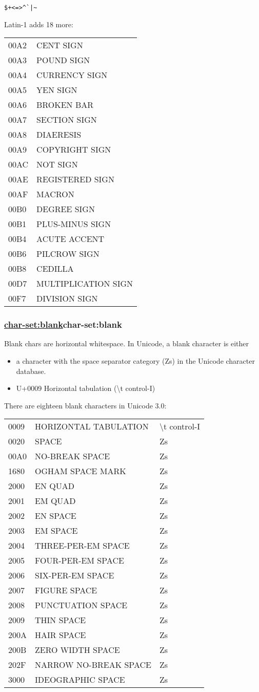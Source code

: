 \begin{verbatim}
$+<=>^`|~
\end{verbatim}

Latin-1 adds 18 more:

\begin{tabular}{ll}
00A2 & CENT SIGN\tabularnewline
00A3 & POUND SIGN\tabularnewline
00A4 & CURRENCY SIGN\tabularnewline
00A5 & YEN SIGN\tabularnewline
00A6 & BROKEN BAR\tabularnewline
00A7 & SECTION SIGN\tabularnewline
00A8 & DIAERESIS\tabularnewline
00A9 & COPYRIGHT SIGN\tabularnewline
00AC & NOT SIGN\tabularnewline
00AE & REGISTERED SIGN\tabularnewline
00AF & MACRON\tabularnewline
00B0 & DEGREE SIGN\tabularnewline
00B1 & PLUS-MINUS SIGN\tabularnewline
00B4 & ACUTE ACCENT\tabularnewline
00B6 & PILCROW SIGN\tabularnewline
00B8 & CEDILLA\tabularnewline
00D7 & MULTIPLICATION SIGN\tabularnewline
00F7 & DIVISION SIGN\tabularnewline
\end{tabular}

\subsubsection{{\href{}{char-set:blank}}{char-set:blank}}\label{char-setblank}

Blank chars are horizontal whitespace. In Unicode, a blank character is
either

\begin{itemize}
\tightlist
\item
  a character with the space separator category (Zs) in the Unicode
  character database.
\item
  U+0009 Horizontal tabulation (\textbackslash{}t control-I)
\end{itemize}

There are eighteen blank characters in Unicode 3.0:

\begin{tabular}{lll}
0009 & HORIZONTAL TABULATION & \textbackslash{}t
control-I\tabularnewline
0020 & SPACE & Zs\tabularnewline
00A0 & NO-BREAK SPACE & Zs\tabularnewline
1680 & OGHAM SPACE MARK & Zs\tabularnewline
2000 & EN QUAD & Zs\tabularnewline
2001 & EM QUAD & Zs\tabularnewline
2002 & EN SPACE & Zs\tabularnewline
2003 & EM SPACE & Zs\tabularnewline
2004 & THREE-PER-EM SPACE & Zs\tabularnewline
2005 & FOUR-PER-EM SPACE & Zs\tabularnewline
2006 & SIX-PER-EM SPACE & Zs\tabularnewline
2007 & FIGURE SPACE & Zs\tabularnewline
2008 & PUNCTUATION SPACE & Zs\tabularnewline
2009 & THIN SPACE & Zs\tabularnewline
200A & HAIR SPACE & Zs\tabularnewline
200B & ZERO WIDTH SPACE & Zs\tabularnewline
202F & NARROW NO-BREAK SPACE & Zs\tabularnewline
3000 & IDEOGRAPHIC SPACE & Zs\tabularnewline
\end{tabular}

